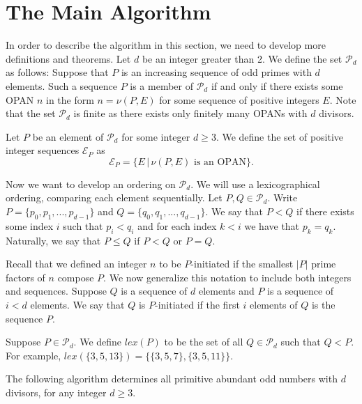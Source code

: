 \documentclass[../paper.tex]{subfiles}
\begin{document}
\section{The Main Algorithm}

In order to describe the algorithm in this section, we need to
develop more definitions and theorems. Let $d$ be an integer
greater than 2. We define the set $\mathcal{P}_d$ as follows: 
Suppose that $P$ is an increasing sequence of odd primes with 
$d$ elements. Such a sequence $P$ is a member of 
$\mathcal{P}_d$ if and only if there exists some OPAN $n$ in the 
form $n = \nu (P, E)$ for some sequence of positive integers $E$.
Note that the set $\mathcal{P}_d$ is finite as there exists only 
finitely many OPANs with $d$ divisors{\cite{dickson}}.

Let $P$ be an element of $\mathcal{P}_d$ for some integer $d \geq 
3$. We define the set of positive integer sequences 
$\mathcal{E}_P$ as 
%
$$\mathcal{E}_P = \{E\, |\, \nu(P, E) \text{ is an OPAN}\}.$$
%

Now we want to develop an ordering on $\mathcal{P}_d$. We will use
a lexicographical ordering, comparing each element sequentially.
Let $P, Q \in \mathcal{P}_d$. Write $P = \{p_0, p_1, ..., p_{d-1}\}$
and $Q = \{q_0, q_1, ..., q_{d-1}\}$. We say that $P < Q$ if 
there exists some index $i$ such that $p_i < q_i$ and for each
index $k < i$ we have that $p_k = q_k$. Naturally, we say that 
$P \leq Q$ if $P < Q$ or $P = Q$. 

Recall that we defined an integer $n$ to be $P$-initiated if the
smallest $|P|$ prime factors of $n$ compose $P$. We now generalize
this notation to include both integers and sequences. Suppose $Q$
is a sequence of $d$ elements and $P$ is a sequence of $i < d$
elements. We say that $Q$ is $P$-initiated if the first $i$
elements of $Q$ is the sequence $P$.

Suppose $P \in \mathcal{P}_d$. We define $lex(P)$ to be the set
of all $Q \in \mathcal{P}_d$ such that $Q < P$. For example,  
$lex(\{3,5,13\}) = \{\{3, 5, 7\}, \{3, 5, 11\}\}$.

\begin{theorem} \label{opan_alg}
The following algorithm determines all primitive
abundant odd numbers with $d$ divisors, for any integer $d \geq 3$.
\end{theorem}
\end{document}
